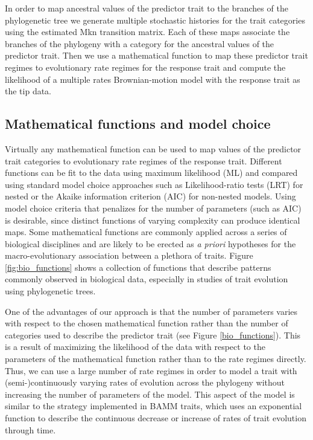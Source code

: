 In order to map ancestral values of the predictor trait to the branches of the phylogenetic tree we generate multiple stochastic histories for the trait categories using the estimated Mkn transition matrix. Each of these maps associate the branches of the phylogeny with a category for the ancestral values of the predictor trait. Then we use a mathematical function to map these predictor trait regimes to evolutionary rate regimes for the response trait and compute the likelihood of a multiple rates Brownian-motion model with the response trait as the tip data.

\subsection{Mathematical functions and model choice}

Virtually any mathematical function can be used to map values of the predictor trait categories to evolutionary rate regimes of the response trait. Different functions can be fit to the data using maximum likelihood (ML) and compared using standard model choice approaches such as Likelihood-ratio tests (LRT) for nested or the Akaike information criterion (AIC) for non-nested models. Using model choice criteria that penalizes for the number of parameters (such as AIC) is desirable, since distinct functions of varying complexity can produce identical maps. Some mathematical functions are commonly applied across a series of biological disciplines and are likely to be erected as \textit{a priori} hypotheses for the macro-evolutionary association between a plethora of traits. Figure \ref{fig:bio_functions} shows a collection of functions that describe patterns commonly observed in biological data, especially in studies of trait evolution using phylogenetic trees.

One of the advantages of our approach is that the number of parameters varies with respect to the chosen mathematical function rather than the number of categories used to describe the predictor trait (see Figure \ref{bio_functions}). This is a result of maximizing the likelihood of the data with respect to the parameters of the mathematical function rather than to the rate regimes directly. Thus, we can use a large number of rate regimes in order to model a trait with  (semi-)continuously varying rates of evolution across the phylogeny without increasing the number of parameters of the model. This aspect of the model is similar to the strategy implemented in BAMM traits, which uses an exponential function to describe the continuous decrease or increase of rates of trait evolution through time. %

